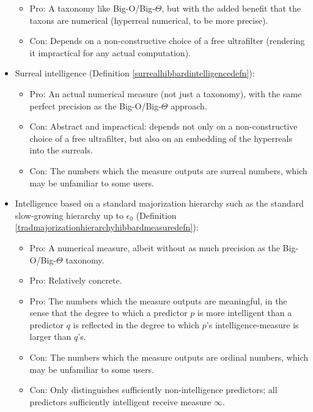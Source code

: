 \documentclass{article}
\begin{document}
\begin{itemize}
\begin{itemize}
        \item
        Pro: A taxonomy like Big-O/Big-$\Theta$, but with the added benefit
        that the taxons are numerical (hyperreal numerical, to be more precise).
        \item
        Con: Depends on a non-constructive choice of a free ultrafilter (rendering it
        impractical for any actual computation).
    \end{itemize}
    \item
    Surreal intelligence (Definition \ref{surrealhibbardintelligencedefn}):
    \begin{itemize}
        \item
        Pro: An actual numerical measure (not just a taxonomy), with the same perfect
        precision as the Big-O/Big-$\Theta$ approach.
        \item
        Con: Abstract and impractical: depends not only on a
        non-constructive choice of
        a free ultrafilter, but also on an embedding of the hyperreals into the surreals.
        \item
        Con: The numbers which the measure outputs are surreal numbers, which may be
        unfamiliar to some users.
    \end{itemize}
    \item
    Intelligence based on a standard majorization hierarchy such as the
    standard slow-growing hierarchy up to $\epsilon_0$
    (Definition \ref{tradmajorizationhierarchyhibbardmeasuredefn}):
    \begin{itemize}
        \item
        Pro: A numerical measure, albeit without as much precision as the
        Big-O/Big-$\Theta$ taxonomy.
        \item
        Pro: Relatively concrete.
        \item
        Pro: The numbers which the measure outputs are meaningful, in the sense that
        the degree to which a predictor $p$ is more intelligent than a
        predictor $q$ is reflected
        in the degree to which $p$'s intelligence-measure is larger than $q$'s.
        \item
        Con: The numbers which the measure outputs are ordinal numbers, which may be
        unfamiliar to some users.
        \item
        Con: Only distinguishes sufficiently non-intelligence predictors; all predictors
        sufficiently intelligent receive measure $\infty$.
    \end{itemize}

\end{itemize}
\end{document}
